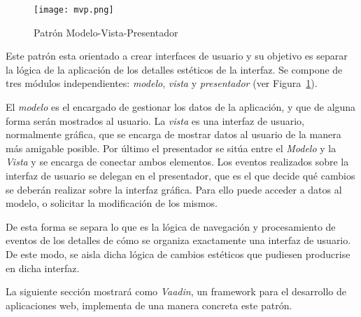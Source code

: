\begin{figure}[H]
	\centering
	\texttt{[image: mvp.png]}
	\caption{Patrón Modelo-Vista-Presentador}\label{fig:mvp}
\end{figure}

Este patrón esta orientado a crear interfaces de usuario y su objetivo es separar la lógica de la aplicación de los detalles estéticos de la interfaz. Se compone de tres módulos independientes: \emph{modelo}, \emph{vista} y \emph{presentador} (ver Figura~\ref{fig:mvp}).



El \emph{modelo} es el encargado de gestionar los datos de la aplicación, y que de alguna forma serán mostrados al usuario. La \emph{vista} es una interfaz de usuario, normalmente gráfica, que se encarga de mostrar datos al usuario de la manera más amigable posible. Por último el presentador se sitúa entre el \emph{Modelo} y la \emph{Vista} y se encarga de conectar ambos elementos. Los eventos realizados sobre la interfaz de usuario se delegan en el presentador, que es el que decide qué cambios se deberán realizar sobre la interfaz gráfica. Para ello puede acceder a datos al modelo, o solicitar la modificación de los mismos. 

De esta forma se separa lo que es la lógica de navegación y procesamiento de eventos de los detalles de cómo se organiza exactamente una interfaz de usuario. De este modo, se aisla dicha lógica de cambios estéticos que pudiesen producrise en dicha interfaz. 

La siguiente sección mostrará como \emph{Vaadin}, un framework para el desarrollo de aplicaciones web, implementa de una manera concreta este patrón.

 


